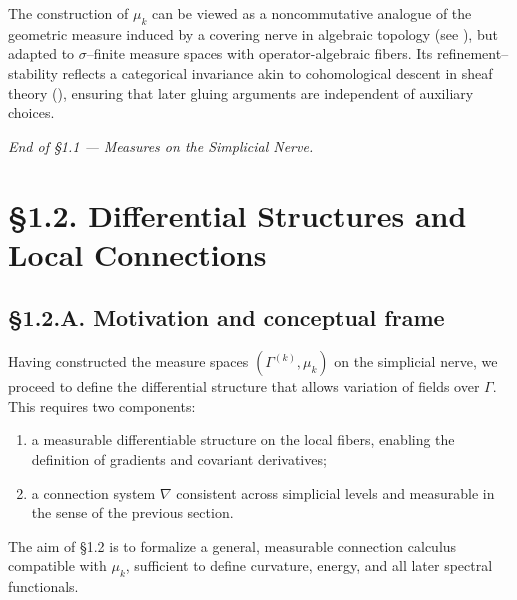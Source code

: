 \begin{remark}
The construction of $\mu_k$ can be viewed as a noncommutative analogue of the geometric measure induced by a covering nerve in algebraic topology (see \cite{BottTu,Bredon}), but adapted to $\sigma$–finite measure spaces with operator-algebraic fibers. 
Its refinement–stability reflects a categorical invariance akin to cohomological descent in sheaf theory (\cite{KashiwaraSchapira}), ensuring that later gluing arguments are independent of auxiliary choices.
\end{remark}

\begin{center}
\textit{End of §1.1 — Measures on the Simplicial Nerve.}
\end{center}


\section{§1.2. Differential Structures and Local Connections}
\label{sec:1.2-connections}

\subsection*{§1.2.A. Motivation and conceptual frame}

Having constructed the measure spaces $(\Gamma^{(k)},\mu_k)$ on the simplicial nerve, we proceed to define the differential structure that allows variation of fields over $\Gamma$.  
This requires two components:
\begin{enumerate}
  \item a measurable differentiable structure on the local fibers, enabling the definition of gradients and covariant derivatives; 
  \item a connection system $\nabla$ consistent across simplicial levels and measurable in the sense of the previous section.
\end{enumerate}
The aim of §1.2 is to formalize a general, measurable connection calculus compatible with $\mu_k$, sufficient to define curvature, energy, and all later spectral functionals.


